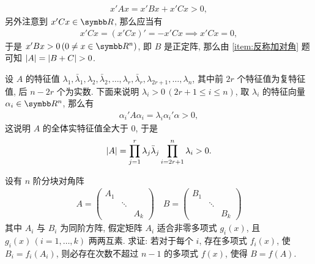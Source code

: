 \begin{exercise}[series=exer]
\begin{answer}
\begin{method}
            \begin{align*}
                x'Ax = x'Bx + x'Cx > 0,
            \end{align*}
            另外注意到 $ x'Cx\in \R $, 那么应当有
            \begin{align*}
                x'Cx = (x'Cx)' = -x'Cx \implies x'Cx = 0,
            \end{align*}
            于是 $ x'Bx > 0\,(0 \ne x \in \R^{n}) $, 即 $ B $ 是正定阵, 那么由 \ref{item:反称加对角} 题可知 $ \abs{A} = \abs{B + C} > 0 $.
            \item 设 $ A $ 的特征值 $ \lambda_{1}, \bar{\lambda}_{1}, \lambda_{2}, \bar{\lambda}_{2}, \dots, \lambda_{r}, \bar{\lambda}_{r}, \lambda_{2r + 1}, \dots, \lambda_{n} $, 其中前 $ 2r $ 个特征值为复特征值, 后 $ n - 2r $ 个为实数. 下面来说明 $ \lambda_{i} > 0\,(2r + 1 \le i \le n) $, 取 $ \lambda_{i} $ 的特征向量 $ \alpha_{i} \in \R^{n} $, 那么有
            \begin{align*}
                \alpha_{i}'A\alpha_{i} = \lambda_{i}\alpha_{i}'\alpha > 0,
            \end{align*}
            这说明 $ A $ 的全体实特征值全大于 $ 0 $, 于是
            \begin{align*}
                \abs{A} = \prod_{j = 1}^{r}\lambda_{j}\bar{\lambda}_{j}\prod_{i = 2r + 1}^{n} \lambda_{i} > 0.
            \end{align*}
        \end{method}
    \end{answer}
    \item 设有 $ n $ 阶分块对角阵 
    \begin{align*}
        A = \begin{pmatrix}
            A_{1} & & \\
            & \ddots & \\
            & & A_{k}
        \end{pmatrix}\quad 
        B = \begin{pmatrix}
            B_{1} & & \\
            & \ddots & \\
            & & B_{k}
        \end{pmatrix}
    \end{align*}
    其中 $ A_{i} $ 与 $ B_{i} $ 为同阶方阵, 假定矩阵 $ A_{i} $ 适合非零多项式 $ g_{i}(x) $, 且 $ g_{i}(x)\,(i = 1, \dots, k) $ 两两互素. 求证: 若对于每个 $ i $, 存在多项式 $ f_{i}(x) $, 使 $ B_{i} = f_{i}(A_{i}) $, 则必存在次数不超过 $ n-1 $ 的多项式 $ f(x) $, 使得 $ B = f(A) $.

\end{exercise}
